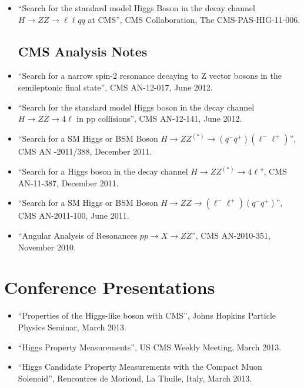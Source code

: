 \documentclass[12pt,oneside,final]{thesis}
\begin{document}
\begin{vita}
\begin{itemize}
\item ``Search for the standard model Higgs Boson in the decay channel $H \to ZZ \to \ell\ell qq$ at CMS'', CMS Collaboration, The CMS-PAS-HIG-11-006.

\subsection*{CMS Analysis Notes}

\item ``Search for a narrow spin-2 resonance decaying to Z vector bosons in the semileptonic final state'', CMS AN-12-017, June 2012.

\item ``Search for the standard model Higgs boson in the decay channel $H \to ZZ \to 4\ell$ in pp collisions'', CMS AN-12-141, June 2012.

\item ``Search for a SM Higgs or BSM Boson $H \to ZZ^{(*)} \to (q^-q^+)(\ell^-\ell^+)$'', CMS AN -2011/388, December 2011.

\item ``Search for a Higgs boson in the decay channel $H \to ZZ^{(*)} \to 4\ell$'', CMS AN-11-387, December 2011.

\item ``Search for a SM Higgs or BSM Boson $H \to ZZ \to (\ell^-\ell^+)(q^-q^+)$'', CMS AN-2011-100, June 2011.

\item ``Angular Analysis of Resonances $pp \to X \to ZZ$'', CMS AN-2010-351, November 2010.

\end{itemize}

\section*{Conference Presentations}

\begin{itemize}

\item ``Properties of the Higgs-like boson with CMS'', Johns Hopkins Particle Physics Seminar, March 2013.

\item ``Higgs Property Measurements'', US CMS Weekly Meeting, March 2013.

\item ``Higgs Candidate Property Measurements with the Compact Muon Solenoid'', Rencontres de Moriond, La Thuile, Italy, March 2013.


\end{itemize}
\end{vita}
\end{document}

